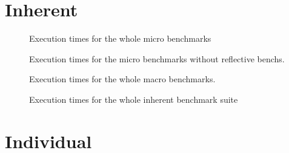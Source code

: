 \documentclass[12pt]{article}
\begin{document}
\section{Inherent}

\begin{figure}
\begin{center}
\MicroPerfComparisonPlot
\end{center}
\vspace*{-5pt}
\caption{Execution times for the whole micro benchmarks}
\label{fig:perf-overview}
\end{figure}

\MicroTableSummary

\MicroTableOverall


\begin{figure}
\begin{center}
\MicroWithoutRecursivePerfComparisonPlot
\end{center}
\vspace*{-5pt}
\caption{Execution times for the micro benchmarks without reflective benchs.}
\label{fig:perf-overview}
\end{figure}

\MicroWithoutRecursiveTableSummary

\MicroWithoutRecursiveTableOverall


\begin{figure}
\begin{center}
\MacroPerfComparisonPlot
\end{center}
\vspace*{-5pt}
\caption{Execution times for the whole macro benchmarks.}
\label{fig:perf-overview}
\end{figure}

\MacroTableSummary

\MacroTableOverall

\begin{figure}
\begin{center}
\OverallPerfComparisonPlot
\end{center}
\vspace*{-5pt}
\caption{Execution times for the whole inherent benchmark suite}
\label{fig:perf-overview}
\end{figure}

\OverallTableSummary

\OverallTableOverall

\section{Individual}

\MopTableSummary

\MegamorphicTableSummary

\MopTableOverall

\MegaTableOverall
\end{document}
